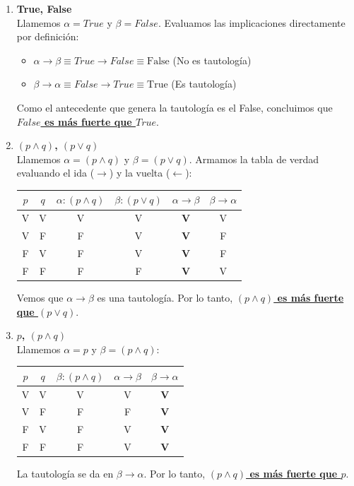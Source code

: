 \begin{enumerate}[label=\textbf{\alph*)}]

    \item \textbf{True, False} \\
    Llamemos $\alpha = True$ y $\beta = False$. Evaluamos las implicaciones directamente por definición:
    \begin{itemize}
        \item $\alpha \rightarrow \beta \equiv True \rightarrow False \equiv \text{False}$ (No es tautología)
        \item $\beta \rightarrow \alpha \equiv False \rightarrow True \equiv \text{True}$ (Es tautología)
    \end{itemize}
    Como el antecedente que genera la tautología es el False, concluimos que \underline{\textbf{$False$ es más fuerte que $True$}}.

    \vspace{0.4cm}
    \item \textbf{$(p \wedge q)$, $(p \vee q)$} \\
    Llamemos $\alpha = (p \wedge q)$ y $\beta = (p \vee q)$. Armamos la tabla de verdad evaluando el ida ($\rightarrow$) y la vuelta ($\leftarrow$):
    \begin{center}
    \begin{tabular}{|c|c|c|c|c|c|}
    \hline
    $p$ & $q$ & $\alpha : (p \wedge q)$ & $\beta : (p \vee q)$ & $\alpha \rightarrow \beta$ & $\beta \rightarrow \alpha$ \\
    \hline
    V & V & V & V & \textbf{V} & V \\
    V & F & F & V & \textbf{V} & F \\
    F & V & F & V & \textbf{V} & F \\
    F & F & F & F & \textbf{V} & V \\
    \hline
    \end{tabular}
    \end{center}
    Vemos que $\alpha \rightarrow \beta$ es una tautología. Por lo tanto, \underline{\textbf{$(p \wedge q)$ es más fuerte que $(p \vee q)$}}.

    \vspace{0.4cm}
    \item \textbf{$p$, $(p \wedge q)$} \\
    Llamemos $\alpha = p$ y $\beta = (p \wedge q)$:
    \begin{center}
    \begin{tabular}{|c|c|c|c|c|}
    \hline
    $p$ & $q$ & $\beta : (p \wedge q)$ & $\alpha \rightarrow \beta$ & $\beta \rightarrow \alpha$ \\
    \hline
    V & V & V & V & \textbf{V} \\
    V & F & F & F & \textbf{V} \\
    F & V & F & V & \textbf{V} \\
    F & F & F & V & \textbf{V} \\
    \hline
    \end{tabular}
    \end{center}
    La tautología se da en $\beta \rightarrow \alpha$. Por lo tanto, \underline{\textbf{$(p \wedge q)$ es más fuerte que $p$}}.


\end{enumerate}
